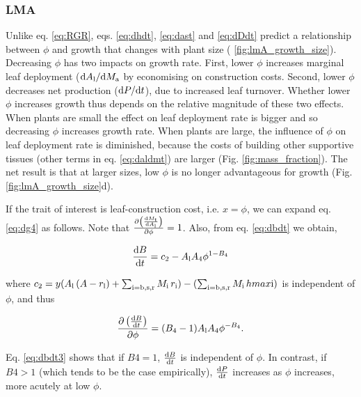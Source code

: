 \documentclass[a4paper,11pt]{article}
\begin{document}
\subsubsection{LMA}

Unlike eq. \ref{eq:RGR}, eqs. \ref{eq:dhdt}, \ref{eq:dast} and
\ref{eq:dDdt} predict a relationship between $\phi$ and growth that
changes with plant size ( \ref{fig:lmA_growth_size}).
Decreasing $\phi$ has two impacts on growth rate. First, lower
$\phi$ increases marginal leaf deployment
(${\rm d}A_{\rm l} / {\rm d}M_{\rm a}$ by economising on
construction costs. Second, lower $\phi$ decreases net production
(${\rm d}P / {\rm d}t$), due to increased leaf turnover. Whether
lower $\phi$ increases growth thus depends on the relative magnitude
of these two effects. When plants are small the effect on leaf
deployment rate is bigger and so decreasing $\phi$ increases growth
rate. When plants are large, the influence of $\phi$ on leaf
deployment rate is diminished, because the costs of building other
supportive tissues (other terms in eq. \ref{eq:daldmt}) are larger (Fig.
\ref{fig:mass_fraction}). The net result is that at larger sizes, low
$\phi$ is no longer advantageous for growth (Fig.
\ref{fig:lmA_growth_size}d).

If the trait of interest is leaf-construction cost, i.e. $x=\phi$, we can expand
eq. \ref{eq:dg4} as follows. Note that $\frac{\partial \left(\frac{{\rm d}M_\textrm
{t}} {{\rm d}A_{\rm l}}\right)}{\partial \phi} = 1$. Also, from eq. \ref{eq:dbdt} we obtain,

\begin{equation}\label{eq:dbdt2}
\frac{{\rm d}B}{{\rm d}t} = c_2 - A_{\rm l} A_4 \phi ^{1-B_4}
\end{equation}

where
$c_2 = y ( A_{\rm l} \, (A - r_{\rm l}) + \sum_\textrm{i=b,s,r}{M_\textrm{i} \, r_\textrm{i}}) - (\sum_\textrm{i=b,s,r}{M_\textrm{i} \, hmax\textrm{i}})$
is independent of $\phi$, and thus

\begin{equation}\label{eq:dbdt3}
\frac{\partial \left( \frac{ {\rm d}B} {{\rm d}t}\right)}{\partial \phi}  =
(B_4-1) A_{\rm l} A_4\phi ^{-B_4}.
\end{equation}

Eq. \ref{eq:dbdt3} shows that if $B4=1$, $\frac{ {\rm d}B} {{\rm d}t}$ is independent
of $\phi$. In contrast, if $B4>1$ (which tends to be the case empirically), $\frac{ \textrm
{d}P} {{\rm d}t}$ increases as $\phi$ increases, more acutely at low $\phi$.
\end{document}
